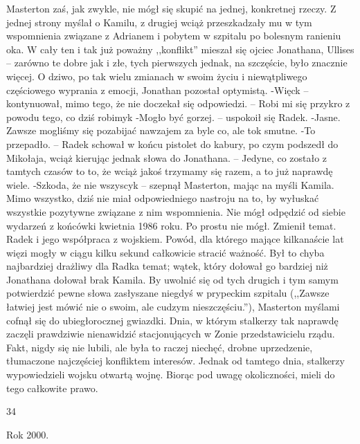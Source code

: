 \documentclass[../MAIN.tex]{subfiles}
\begin{document}
Masterton zaś, jak zwykle, nie mógł się skupić na jednej, konkretnej rzeczy. Z jednej strony myślał o Kamilu, z drugiej wciąż przeszkadzały mu w tym wspomnienia związane z Adrianem i pobytem w szpitalu po bolesnym ranieniu oka. W cały ten i tak już poważny ,,konflikt'' mieszał się ojciec Jonathana, Ullises -- zarówno te dobre jak i złe, tych pierwszych jednak, na szczęście, było znacznie więcej.
O dziwo, po tak wielu zmianach w swoim życiu i niewątpliwego częściowego wyprania z emocji, Jonathan pozostał optymistą.
-Więc\3k -- kontynuował, mimo tego, że nie doczekał się odpowiedzi. -- Robi mi się przykro z powodu tego, co dziś robimy\3k
-Mogło być gorzej. -- uspokoił się Radek.
-Jasne. Zawsze mogliśmy się pozabijać nawzajem za byle co, ale to\3k smutne.
-To przepadło. -- Radek schował w końcu pistolet do kabury, po czym podszedł do Mikołaja, wciąż kierując jednak słowa do Jonathana. -- Jedyne, co zostało z tamtych czasów to to, że wciąż jakoś trzymamy się razem, a to już naprawdę wiele.
-Szkoda, że nie wszyscy\3k -- szepnął Masterton, mając na myśli Kamila. Mimo wszystko, dziś nie miał odpowiedniego nastroju na to, by wyłuskać wszystkie pozytywne związane z nim wspomnienia. Nie mógł odpędzić od siebie wydarzeń z końcówki kwietnia 1986 roku. Po prostu nie mógł. Zmienił temat.
Radek i jego współpraca z wojskiem.
Powód, dla którego mające kilkanaście lat więzi mogły w ciągu kilku sekund całkowicie stracić ważność. Był to chyba najbardziej drażliwy dla Radka temat; wątek, który dołował go bardziej niż Jonathana dołował brak Kamila. By uwolnić się od tych drugich i tym samym potwierdzić pewne słowa zasłyszane niegdyś w prypeckim szpitalu (,,Zawsze łatwiej jest mówić nie o swoim, ale cudzym nieszczęściu.''), Masterton myślami cofnął się do ubiegłorocznej gwiazdki.
Dnia, w którym stalkerzy tak naprawdę zaczęli prawdziwie nienawidzić stacjonujących w Zonie przedstawicielu rządu. Fakt, nigdy się nie lubili, ale była to raczej niechęć, drobne uprzedzenie, tłumaczone najczęściej konfliktem interesów.
Jednak od tamtego dnia, stalkerzy wypowiedzieli wojsku otwartą wojnę.
Biorąc pod uwagę okoliczności, mieli do tego całkowite prawo.

34



Rok 2000.
\end{document}
